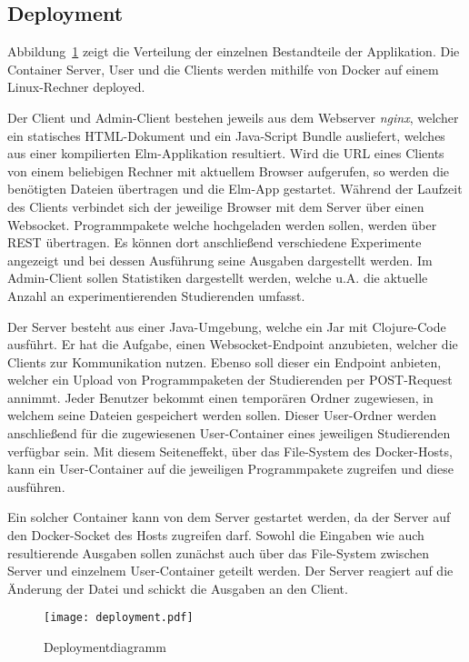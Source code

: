 \subsection{Deployment}
Abbildung~\ref{fig:deployment} zeigt die Verteilung der einzelnen Bestandteile der Applikation.
Die Container Server, User und die Clients werden mithilfe von Docker auf einem Linux-Rechner deployed.
\par
Der Client und Admin-Client bestehen jeweils aus dem Webserver \textit{nginx}, welcher ein statisches HTML-Dokument und ein Java-Script Bundle ausliefert, welches aus einer kompilierten Elm-Applikation resultiert.
Wird die URL eines Clients von einem beliebigen Rechner mit aktuellem Browser aufgerufen, so werden die benötigten Dateien übertragen und die Elm-App gestartet.
Während der Laufzeit des Clients verbindet sich der jeweilige Browser mit dem Server über einen Websocket.
Programmpakete welche hochgeladen werden sollen, werden über REST übertragen.
Es können dort anschließend verschiedene Experimente angezeigt und bei dessen Ausführung seine Ausgaben dargestellt werden.
Im Admin-Client sollen Statistiken dargestellt werden, welche u.A. die aktuelle Anzahl an experimentierenden Studierenden umfasst.
\par
Der Server besteht aus einer Java-Umgebung, welche ein Jar mit Clojure-Code ausführt.
Er hat die Aufgabe, einen Websocket-Endpoint anzubieten, welcher die Clients zur Kommunikation nutzen.
Ebenso soll dieser ein Endpoint anbieten, welcher ein Upload von Programmpaketen der Studierenden per POST-Request annimmt.
Jeder Benutzer bekommt einen temporären Ordner zugewiesen, in welchem seine Dateien gespeichert werden sollen.
Dieser User-Ordner werden anschließend für die zugewiesenen User-Container eines jeweiligen Studierenden verfügbar sein.
Mit diesem Seiteneffekt, über das File-System des Docker-Hosts, kann ein User-Container auf die jeweiligen Programmpakete zugreifen und diese ausführen.
\par
Ein solcher Container kann von dem Server gestartet werden, da der Server auf den Docker-Socket des Hosts zugreifen darf.
Sowohl die Eingaben wie auch resultierende Ausgaben sollen zunächst auch über das File-System zwischen Server und einzelnem User-Container geteilt werden.
Der Server reagiert auf die Änderung der Datei und schickt die Ausgaben an den Client.

\begin{landscape}
  \begin{figure}[h]
    \centering
    \texttt{[image: deployment.pdf]}
    \caption{Deploymentdiagramm}
    \label{fig:deployment}
  \end{figure}
\end{landscape}

